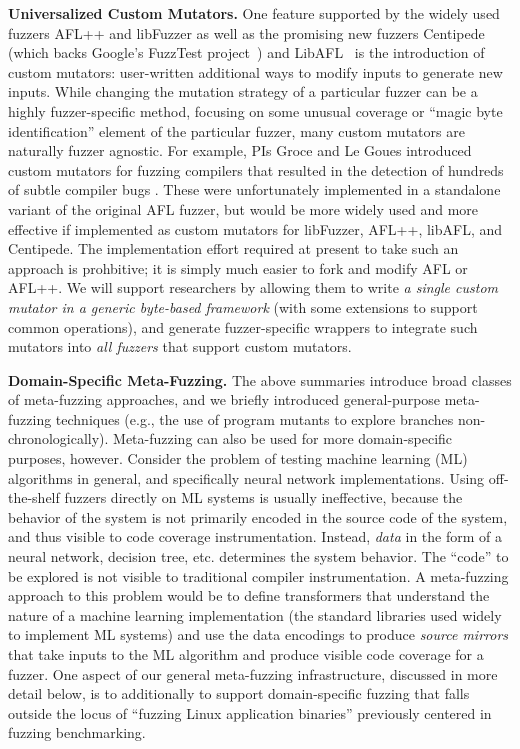 \vspace{1ex}
\noindent\textbf{Universalized Custom Mutators.}  One feature supported by
the widely used fuzzers AFL++ and libFuzzer as well as the promising
new fuzzers Centipede (which backs Google's FuzzTest
project~\cite{fuzztest}) and LibAFL~\cite{libafl} is the introduction of custom mutators:  user-written 
additional ways to modify inputs to generate new inputs.  While changing the 
mutation strategy of a particular fuzzer can be a highly fuzzer-specific 
method, focusing on some unusual coverage or ``magic byte identification'' 
element of the particular fuzzer, many custom mutators are naturally fuzzer 
agnostic.  For example, PIs Groce and Le Goues introduced custom mutators for 
fuzzing compilers that resulted in the detection of hundreds of subtle compiler 
bugs \cite{cc2022}. These were unfortunately implemented in a standalone variant of the 
original AFL fuzzer, but would be more widely used and more effective if 
implemented as custom mutators for libFuzzer, AFL++, libAFL, and
Centipede.  The implementation effort required at present to take such
an approach is prohbitive; it is simply much easier to fork and modify
AFL or AFL++.  We will support 
researchers by allowing them to write \emph{a single custom mutator 
in a generic byte-based framework} (with some extensions to support
common operations), and generate fuzzer-specific wrappers to integrate such 
mutators into \emph{all fuzzers} that support custom mutators.

\vspace{1ex}
\noindent\textbf{Domain-Specific Meta-Fuzzing.} The above summaries introduce 
broad classes of meta-fuzzing approaches, and we briefly introduced  
general-purpose meta-fuzzing techniques (e.g., the use of program mutants to 
explore branches non-chronologically).  Meta-fuzzing can also be used for more 
domain-specific purposes, however.  Consider the problem of testing machine 
learning (ML) algorithms in general, and specifically neural network 
implementations.  Using off-the-shelf fuzzers directly on ML systems is usually 
ineffective, because the behavior of the system is not primarily encoded in the 
source code of the system, and thus visible to code coverage instrumentation.  
Instead, \emph{data} in the form of a neural network, decision tree, etc. 
determines the system behavior.  The ``code'' to be explored is not visible to 
traditional compiler instrumentation.  A meta-fuzzing approach to this problem 
would be to define transformers that understand the nature of a machine 
learning implementation (the standard libraries used widely to implement ML 
systems) and use the data encodings to produce \emph{source mirrors} that take 
inputs to the ML algorithm and produce visible code coverage for a fuzzer.  One 
aspect of our general meta-fuzzing infrastructure, discussed in more detail 
below, is to additionally to support domain-specific fuzzing that falls outside 
the locus of ``fuzzing Linux application binaries'' previously centered in 
fuzzing benchmarking.


